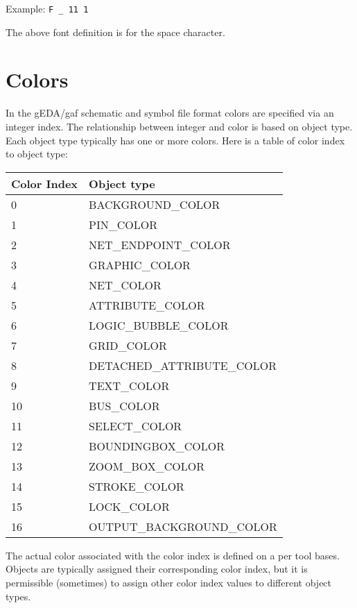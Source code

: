 \documentclass{article}
\begin{document}
Example:\newline
{\tt F \_ 11 1}

The above font definition is for the space character.

\section{Colors}

In the gEDA/gaf schematic and symbol file format colors are specified via
an integer index.  The relationship between integer and color is based on
object type.  Each object type typically has one or more colors.  Here is 
a table of color index to object type:


\begin{table}[h]
\begin{tabular}{|l|l|} \hline
Color Index	& Object type \\ \hline
\hline
0 		& BACKGROUND\_COLOR 		\\ \hline 
1 		& PIN\_COLOR 			\\ \hline
2 		& NET\_ENDPOINT\_COLOR 		\\ \hline 
3 		& GRAPHIC\_COLOR		\\ \hline
4 		& NET\_COLOR 			\\ \hline                      
5 		& ATTRIBUTE\_COLOR  		\\ \hline
6 		& LOGIC\_BUBBLE\_COLOR 		\\ \hline 
7 		& GRID\_COLOR 			\\ \hline 
8 		& DETACHED\_ATTRIBUTE\_COLOR    \\ \hline 
9 		& TEXT\_COLOR			\\ \hline 
10 		& BUS\_COLOR 			\\ \hline 
11		& SELECT\_COLOR			\\ \hline
12 		& BOUNDINGBOX\_COLOR		\\ \hline
13 		& ZOOM\_BOX\_COLOR 		\\ \hline 
14 		& STROKE\_COLOR			\\ \hline
15 		& LOCK\_COLOR			\\ \hline
16 		& OUTPUT\_BACKGROUND\_COLOR     \\ \hline 
\end{tabular}
\end{table}

The actual color associated with the color index is defined on a per
tool bases.  Objects are typically assigned their corresponding color
index, but it is permissible (sometimes) to assign other color index
values to different object types.
\end{document}
